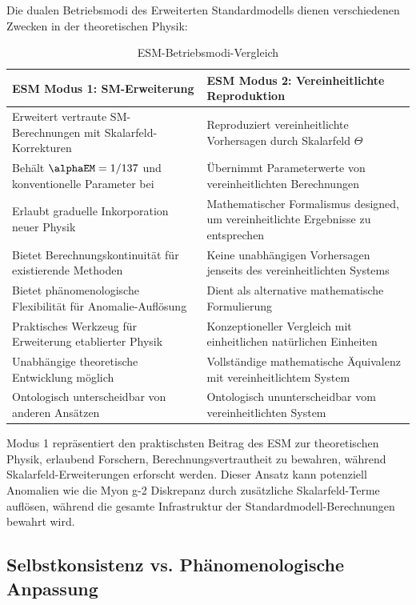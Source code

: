 	Die dualen Betriebsmodi des Erweiterten Standardmodells dienen verschiedenen Zwecken in der theoretischen Physik:
	
	\begin{table}[ht]
		\centering
		\caption{ESM-Betriebsmodi-Vergleich}
		\label{tab:esm_modes_comparison}
		\begin{tabular}{p{}|p{}}
			\hline
			\textbf{ESM Modus 1: SM-Erweiterung} & \textbf{ESM Modus 2: Vereinheitlichte Reproduktion} \\
			\hline
			Erweitert vertraute SM-Berechnungen mit Skalarfeld-Korrekturen & Reproduziert vereinheitlichte Vorhersagen durch Skalarfeld $\Theta$ \\
			\hline
			Behält $\alphaEM = 1/137$ und konventionelle Parameter bei & Übernimmt Parameterwerte von vereinheitlichten Berechnungen \\
			\hline
			Erlaubt graduelle Inkorporation neuer Physik & Mathematischer Formalismus designed, um vereinheitlichte Ergebnisse zu entsprechen \\
			\hline
			Bietet Berechnungskontinuität für existierende Methoden & Keine unabhängigen Vorhersagen jenseits des vereinheitlichten Systems \\
			\hline
			Bietet phänomenologische Flexibilität für Anomalie-Auflösung & Dient als alternative mathematische Formulierung \\
			\hline
			Praktisches Werkzeug für Erweiterung etablierter Physik & Konzeptioneller Vergleich mit einheitlichen natürlichen Einheiten \\
			\hline
			Unabhängige theoretische Entwicklung möglich & Vollständige mathematische Äquivalenz mit vereinheitlichtem System \\
			\hline
			Ontologisch unterscheidbar von anderen Ansätzen & Ontologisch ununterscheidbar vom vereinheitlichten System \\
			\hline
		\end{tabular}
	\end{table}
	
	Modus 1 repräsentiert den praktischsten Beitrag des ESM zur theoretischen Physik, erlaubend Forschern, Berechnungsvertrautheit zu bewahren, während Skalarfeld-Erweiterungen erforscht werden. Dieser Ansatz kann potenziell Anomalien wie die Myon g-2 Diskrepanz durch zusätzliche Skalarfeld-Terme auflösen, während die gesamte Infrastruktur der Standardmodell-Berechnungen bewahrt wird.
	
	\subsection{Selbstkonsistenz vs. Phänomenologische Anpassung}
	\label{subsec:self_consistency_comparison}
	
